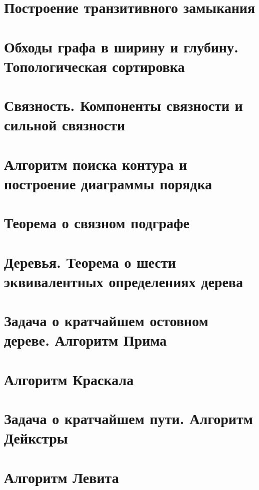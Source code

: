 \documentclass[12pt, fleqn]{article}
\begin{document}
  \section{Построение транзитивного замыкания}
  \newpage

  \section{Обходы графа в ширину и глубину. Топологическая сортировка}
  \newpage

  \section{Связность. Компоненты связности и сильной связности}
  \newpage

  \section{Алгоритм поиска контура и построение диаграммы порядка}
  \newpage

  \section{Теорема о связном подграфе}

  
  \newpage

  \section{Деревья. Теорема о шести эквивалентных определениях дерева}
  
  \newpage

  \section{Задача о кратчайшем остовном дереве. Алгоритм Прима}
  \newpage

  \section{Алгоритм Краскала}
  \newpage

  \section{Задача о кратчайшем пути. Алгоритм Дейкстры}
  \newpage

  \section{Алгоритм Левита}
  
  \newpage
\end{document}
